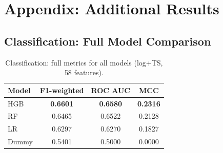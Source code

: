 \documentclass[runningheads]{llncs}
\begin{document}







\appendix
\appendix

\section{Appendix: Additional Results}
\label{app:additional-results}

\subsection{Classification: Full Model Comparison}

\begin{table}[H]
    \centering
    \caption{Classification: full metrics for all models (log+TS, 58 features).}
    \label{tab:app-classification}
    \begin{tabularx}{0.85\textwidth}{lccc}
        \toprule
        Model & F1-weighted & ROC AUC & MCC \\
        \midrule
        HGB & \textbf{0.6601} & \textbf{0.6580} & \textbf{0.2316} \\
        RF  & 0.6465 & 0.6522 & 0.2128 \\
        LR  & 0.6297 & 0.6270 & 0.1827 \\
        Dummy & 0.5401 & 0.5000 & 0.0000 \\
        \bottomrule
    \end{tabularx}
\end{table}
\end{document}
